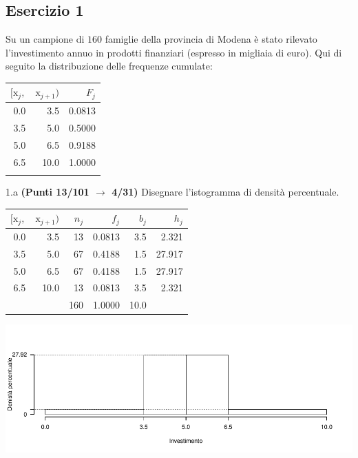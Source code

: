 \documentclass[
  11pt,
]{book}
\theoremstyle{mytheoremstyle}
\theoremstyle{mydefstyle}
\newenvironment{sol}
  {
  \begin{tcolorbox}[enhanced,breakable,arc=0.1mm,boxrule=1pt,colback=white,colframe=iblue,
  title=\bf \fontfamily{lmss}\selectfont \hspace{.5 cm} Soluzione,drop fuzzy shadow]

}{
\end{tcolorbox}
  }
\begin{document}
\subsection{Esercizio 1}\label{esercizio-1-21}

Su un campione di \(160\) famiglie della provincia di Modena è stato rilevato l'investimento annuo in prodotti finanziari (espresso in migliaia di euro). Qui di seguito la distribuzione delle frequenze cumulate:

\begin{table}[H]
\centering
\begin{tabular}{rrr}
\toprule
$[\text{x}_j,$ & $\text{x}_{j+1})$ & $F_j$\\
\midrule
0.0 & 3.5 & 0.0813\\
3.5 & 5.0 & 0.5000\\
5.0 & 6.5 & 0.9188\\
6.5 & 10.0 & 1.0000\\
 &  & \\
\bottomrule
\end{tabular}
\end{table}

1.a \textbf{(Punti 13/101 \(\rightarrow\) 4/31)} Disegnare l'istogramma di densità percentuale.

\begin{sol}

\begin{table}[H]
\centering
\begin{tabular}{rrrrrr}
\toprule
$[\text{x}_j,$ & $\text{x}_{j+1})$ & $n_j$ & $f_j$ & $b_j$ & $h_j$\\
\midrule
0.0 & 3.5 & 13 & 0.0813 & 3.5 & 2.321\\
3.5 & 5.0 & 67 & 0.4188 & 1.5 & 27.917\\
5.0 & 6.5 & 67 & 0.4188 & 1.5 & 27.917\\
6.5 & 10.0 & 13 & 0.0813 & 3.5 & 2.321\\
 &  & 160 & 1.0000 & 10.0 & \\
\bottomrule
\end{tabular}
\end{table}

\begin{center}\includegraphics{Esami_passati_con_soluzioni_files/figure-latex/2023-127-1} \end{center}

\end{sol}
\end{document}

